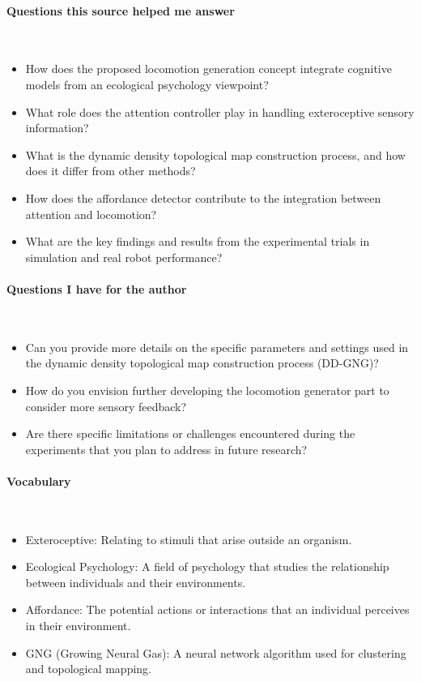 \vspace*{-0.5cm}
\paragraph{Questions this source helped me answer} \

\begin{itemize}
    \item How does the proposed locomotion generation concept integrate cognitive models from an ecological psychology viewpoint?
    \item What role does the attention controller play in handling exteroceptive sensory information?
    \item What is the dynamic density topological map construction process, and how does it differ from other methods?
    \item How does the affordance detector contribute to the integration between attention and locomotion?
    \item What are the key findings and results from the experimental trials in simulation and real robot performance?   
\end{itemize}

\vspace*{-0.5cm}
\paragraph{Questions I have for the author} \ 

\begin{itemize}
    \item Can you provide more details on the specific parameters and settings used in the dynamic density topological map construction process (DD-GNG)?
    \item How do you envision further developing the locomotion generator part to consider more sensory feedback?
    \item Are there specific limitations or challenges encountered during the experiments that you plan to address in future research?
\end{itemize}

\vspace{-0.5cm}
\paragraph{Vocabulary} \ 

\begin{itemize}
\item Exteroceptive: Relating to stimuli that arise outside an organism.
\item Ecological Psychology: A field of psychology that studies the relationship between individuals and their environments.
\item Affordance: The potential actions or interactions that an individual perceives in their environment.
\item GNG (Growing Neural Gas): A neural network algorithm used for clustering and topological mapping.
\end{itemize}

